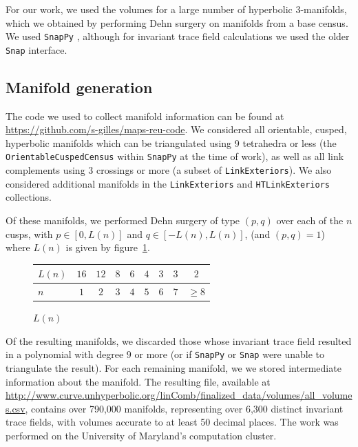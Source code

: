 \documentclass[10pt]{amsart}
\numberwithin{equation}{theorem}
\theoremstyle{definition}
\newcommand{\codebit}[1]{\texttt{#1}}
\newcommand{\prog}[1]{\texttt{#1}}
\begin{document}
For our work, we used the volumes for a large number of hyperbolic
3-manifolds, which we obtained by performing Dehn surgery on manifolds
from a base census.  We used \prog{SnapPy} \parencite{snappy}, although
for invariant trace field calculations we used the older \prog{Snap}
\parencite{snap} interface.

\subsection{Manifold generation}

The code we used to collect manifold information can be found at
\url{https://github.com/s-gilles/maps-reu-code}. We considered all
orientable, cusped, hyperbolic manifolds which can be triangulated
using 9 tetrahedra or less (the \codebit{OrientableCuspedCensus} within
\prog{SnapPy} at the time of work), as well as all link complements
using 3 crossings or more (a subset of \codebit{LinkExteriors}). We
also considered additional manifolds in the \codebit{LinkExteriors}
and \codebit{HTLinkExteriors} collections.

Of these manifolds, we performed Dehn surgery of type $(p,q)$ over
each of the $n$ cusps, with $p \in [0, L(n)]$ and
$q \in [-L(n), L(n)]$, (and $(p,q) = 1$) where $L(n)$ is given by
figure~\ref{fig:ln}.

\begin{figure}[h]
  \begin{tabular}{|l|cccccccc|} \hline $L(n)$ & $16$ & $12$ & $8$ &
    $6$ & $4$ & $3$ & $3$ & $2$ \\ \hline $n $ & $ 1$ & $ 2$ & $3$ &
    $4$ & $5$ & $6$ & $7$ & $ \ge 8$ \\ \hline
  \end{tabular}
  \caption{$L(n)$}
  \label{fig:ln}
\end{figure}

Of the resulting manifolds, we discarded those whose invariant trace
field resulted in a polynomial with degree $9$ or more (or if
\prog{SnapPy} or \prog{Snap} were unable to triangulate the
result). For each remaining manifold, we we stored intermediate
information about the manifold.  The resulting file, available at
\url{http://www.curve.unhyperbolic.org/linComb/finalized_data/volumes/all_volumes.csv},
contains over 790,000 manifolds, representing over 6,300 distinct
invariant trace fields, with volumes accurate to at least 50 decimal
places. The work was performed on the University of Maryland's
computation cluster.
\end{document}
